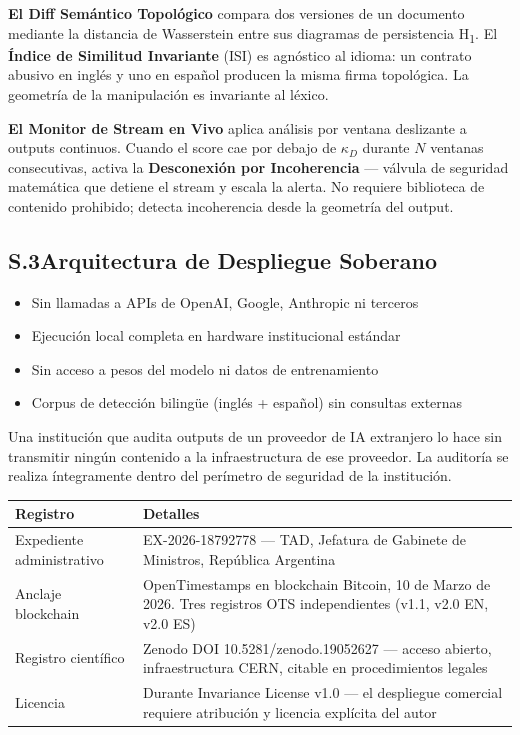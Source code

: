 \documentclass[11pt, a4paper]{article}
\begin{document}
\textbf{El Diff Semántico Topológico} compara dos versiones de un documento
mediante la distancia de Wasserstein entre sus diagramas de persistencia
H\textsubscript{1}. El \textbf{Índice de Similitud Invariante} (ISI) es
agnóstico al idioma: un contrato abusivo en inglés y uno en español producen
la misma firma topológica. La geometría de la manipulación es invariante al léxico.

\textbf{El Monitor de Stream en Vivo} aplica análisis por ventana deslizante a
outputs continuos. Cuando el score cae por debajo de $\kappa_D$ durante $N$
ventanas consecutivas, activa la \textbf{Desconexión por Incoherencia} ---
válvula de seguridad matemática que detiene el stream y escala la alerta. No
requiere biblioteca de contenido prohibido; detecta incoherencia desde la
geometría del output.

\subsection*{S.3\quad Arquitectura de Despliegue Soberano}

\begin{itemize}[leftmargin=*]
  \item Sin llamadas a APIs de OpenAI, Google, Anthropic ni terceros
  \item Ejecución local completa en hardware institucional estándar
  \item Sin acceso a pesos del modelo ni datos de entrenamiento
  \item Corpus de detección bilingüe (inglés + español) sin consultas externas
\end{itemize}

Una institución que audita outputs de un proveedor de IA extranjero lo hace sin
transmitir ningún contenido a la infraestructura de ese proveedor. La auditoría
se realiza íntegramente dentro del perímetro de seguridad de la institución.

\begin{solidbox}
\begin{tabularx}{\linewidth}{lX}
\toprule
\textbf{Registro} & \textbf{Detalles} \\
\midrule
Expediente administrativo & EX-2026-18792778 --- TAD, Jefatura de Gabinete de
  Ministros, República Argentina \\
Anclaje blockchain & OpenTimestamps en blockchain Bitcoin, 10 de Marzo de 2026.
  Tres registros OTS independientes (v1.1, v2.0 EN, v2.0 ES) \\
Registro científico & Zenodo DOI 10.5281/zenodo.19052627 --- acceso abierto,
  infraestructura CERN, citable en procedimientos legales \\
Licencia & Durante Invariance License v1.0 --- el despliegue comercial requiere
  atribución y licencia explícita del autor \\
\bottomrule
\end{tabularx}
\end{solidbox}
\end{document}
